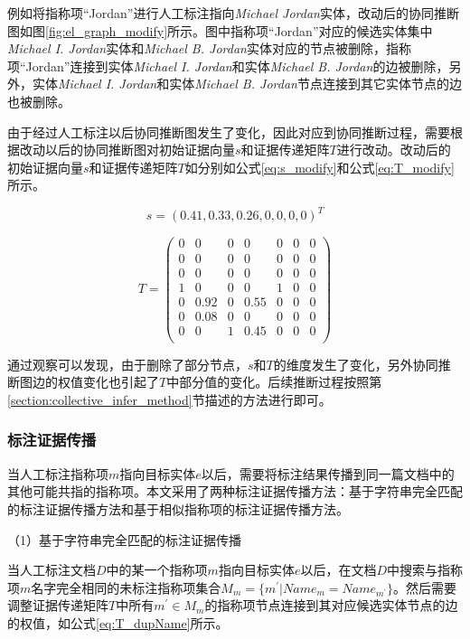 例如将指称项“Jordan”进行人工标注指向\textit{Michael Jordan}实体，改动后的协同推断图如图\ref{fig:el_graph_modify}所示。图中指称项“Jordan”对应的候选实体集中\textit{Michael I. Jordan}实体和\textit{Michael B. Jordan}实体对应的节点被删除，指称项“Jordan”连接到实体\textit{Michael I. Jordan}和实体\textit{Michael B. Jordan}的边被删除，另外，实体\textit{Michael I. Jordan}和实体\textit{Michael B. Jordan}节点连接到其它实体节点的边也被删除。
	
由于经过人工标注以后协同推断图发生了变化，因此对应到协同推断过程，需要根据改动以后的协同推断图对初始证据向量$s$和证据传递矩阵$T$进行改动。改动后的初始证据向量$s$和证据传递矩阵$T$如分别如公式\ref{eq:s_modify}和公式\ref{eq:T_modify}所示。
	
\begin{equation}\label{eq:s_modify}
	s=\left(0.41,0.33,0.26,0,0,0,0\right)^T
\end{equation}
	
\begin{equation}\label{eq:T_modify}
	T=
	\left(
	\begin{matrix}
	0 & 0 & 0 & 0 & 0 & 0 & 0\\
	0 & 0 & 0 & 0 & 0 & 0 & 0\\
	0 & 0 & 0 & 0 & 0 & 0 & 0\\
	1 & 0 & 0 & 0 & 1 & 0 & 0\\
	0 & 0.92 & 0 & 0.55 & 0 & 0 & 0\\
	0 & 0.08 & 0 & 0 & 0 & 0 & 0\\
	0 & 0 & 1 & 0.45 & 0 & 0 & 0\\
	\end{matrix}
	\right)
\end{equation}
	
通过观察可以发现，由于删除了部分节点，$s$和$T$的维度发生了变化，另外协同推断图边的权值变化也引起了$T$中部分值的变化。后续推断过程按照第\ref{section:collective_infer_method}节描述的方法进行即可。

\subsubsection{标注证据传播}
当人工标注指称项$m$指向目标实体$e$以后，需要将标注结果传播到同一篇文档中的其他可能共指的指称项。本文采用了两种标注证据传播方法：基于字符串完全匹配的标注证据传播方法和基于相似指称项的标注证据传播方法。

（1）基于字符串完全匹配的标注证据传播

当人工标注文档$D$中的某一个指称项$m$指向目标实体$e$以后，在文档$D$中搜索与指称项$m$名字完全相同的未标注指称项集合$M_m=\{m^{'}|Name_m=Name_{m^{'}}\}$。然后需要调整证据传递矩阵$T$中所有$m^{'}\in M_m$的指称项节点连接到其对应候选实体节点的边的权值，如公式\ref{eq:T_dupName}所示。
	
